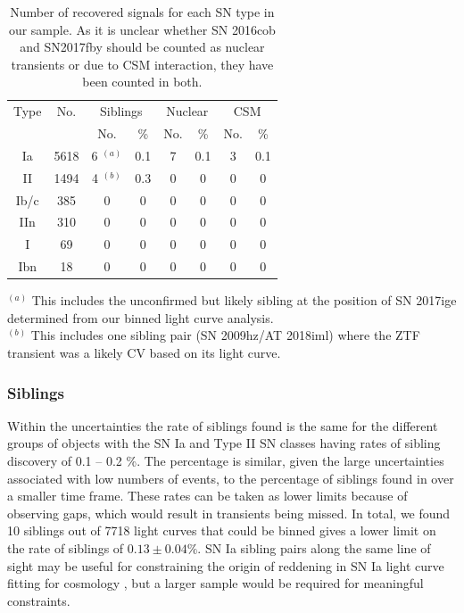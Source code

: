 \documentclass[a4paper,oneside,12pt, class=Latex/Classes/PhDthesisPSnPDF, crop=false]{standalone}
\begin{document}
\begin{table}[]
   \caption{Number of recovered signals for each SN type in our sample. As it is unclear whether SN 2016cob and SN2017fby should be counted as nuclear transients or due to CSM interaction, they have been counted in both.}
    \centering
    \begin{tabular}{cccccccc}
        \hline
        \hline
        Type & No.  & \multicolumn{2}{c}{Siblings}  & \multicolumn{2}{c}{Nuclear} &  \multicolumn{2}{c}{CSM}  \\
        && No. & \% & No. & \%& No. & \% \\
        \hline
        Ia & 5618 & 6 $^{(a)}$ & 0.1 & 7 & 0.1 & 3 & 0.1\\
        II & 1494 & 4 $^{(b)}$ & 0.3 &  0 & 0 & 0 & 0 \\
        Ib/c & 385 & 0 & 0 & 0 & 0 & 0 & 0 \\
        IIn & 310 & 0 & 0 & 0 & 0 & 0 & 0 \\
        I & 69 & 0 & 0 & 0 & 0 & 0 & 0 \\
       Ibn & 18 & 0 & 0 & 0 & 0 & 0 & 0 \\
        \hline
    \end{tabular}
     \label{recovered_obj_breakdown}
    \begin{flushleft}
        $^{(a)}$ This includes the unconfirmed but likely sibling at the position of SN 2017ige determined from our binned light curve analysis.  \\
        $^{(b)}$ This includes one sibling pair (SN 2009hz/AT 2018iml) where the ZTF transient was a likely CV based on its light curve. \\
    \end{flushleft}
\end{table}


\subsubsection{Siblings}
Within the uncertainties the rate of siblings found is the same for the different groups of objects with the SN Ia and Type II SN classes having rates of sibling discovery of 0.1 -- 0.2 \%. The percentage is similar, given the large uncertainties associated with low numbers of events, to the percentage of siblings found in \citet{Terwel_2024_paper1} over a smaller time frame. These rates can be taken as lower limits because of observing gaps, which would result in transients being missed. In total, we found 10 siblings out of 7718 light curves that could be binned gives a lower limit on the rate of siblings of $0.13\pm0.04\%$. SN Ia sibling pairs along the same line of sight may be useful for constraining the origin of reddening in SN Ia light curve fitting for cosmology \citep{DR2_siblings}, but a larger sample would be required for meaningful constraints. 
\end{document}
